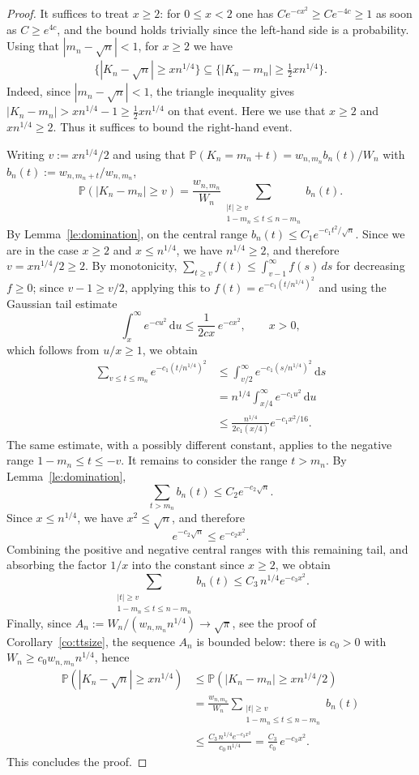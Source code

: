 \documentclass[english,11pt]{smfart}
\newcommand{\Prb}[1]{\mathbb{P}\left(#1\right)}
\numberwithin{equation}{section}
\begin{document}
\begin{proof}
It suffices to treat $x\ge2$: for $0\le x<2$ one has $Ce^{-cx^2}\ge Ce^{-4c}\ge1$
as soon as $C\ge e^{4c}$, and the bound holds trivially since the left-hand side
is a probability. Using that $|m_n-\sqrt n|<1$, for $x\ge2$ we have
\begin{align}\label{eq:proof_tail_K_n}
  \{|K_n-\sqrt n|\ge xn^{1/4}\}\subseteq\{|K_n-m_n|\ge\tfrac12 xn^{1/4}\}.
\end{align}
Indeed, since $|m_n-\sqrt n|<1$, the triangle inequality gives
$|K_n-m_n|>xn^{1/4}-1\ge\tfrac12 xn^{1/4}$
on that event. Here we use that $x \geq 2$ and $xn^{1/4}\ge2$. Thus it suffices to bound the right-hand event.
\smallskip

Writing $v:= xn^{1/4}/2$ and using that
$\Prb{K_n=m_n+t}=w_{n,m_n}b_n(t)/W_n$ with $b_n(t):=w_{n,m_n+t}/w_{n,m_n}$,
\[
  \Prb{|K_n-m_n|\ge v}
  =\frac{w_{n,m_n}}{W_n}
  \sum_{\substack{|t|\ge v\\ 1-m_n\le t\le n-m_n}}b_n(t).
\]
By Lemma~\ref{le:domination}, on the central range $b_n(t)\le C_1 e^{-c_1
t^2/\sqrt n}$. Since we are in the case $x\ge2$ and $x\le n^{1/4}$, we have
$n^{1/4}\ge2$, and therefore $v=xn^{1/4}/2\ge2$. By monotonicity,
$\sum_{t\ge v}f(t)\le\int_{v-1}^\infty f(s)\,ds$ for decreasing $f\ge0$; since
$v-1\ge v/2$, applying this to $f(t)=e^{-c_1(t/n^{1/4})^2}$ and using the
Gaussian tail estimate
\[
  \int_x^\infty e^{-cu^2}\,\mathrm du
  \le\frac{1}{2cx}\,e^{-cx^2}, \qquad x>0,
\]
which follows from $u/x\ge1$, we obtain
\begin{align*}
\sum_{v\le t\le m_n}e^{-c_1(t/n^{1/4})^2}
&\le \int_{v/2}^\infty e^{-c_1(s/n^{1/4})^2}\,\mathrm ds\\
&= n^{1/4}\int_{x/4}^\infty e^{-c_1u^2}\,\mathrm du\\
&\le \frac{n^{1/4}}{2c_1(x/4)}e^{-c_1x^2/16}.
\end{align*}
The same estimate, with a possibly different constant, applies to the
negative range \(1-m_n\le t\le -v\). It remains to consider the range
\(t>m_n\). By Lemma~\ref{le:domination},
\[
\sum_{t>m_n} b_n(t)\le C_2 e^{-c_2\sqrt n}.
\]
Since \(x\le n^{1/4}\), we have \(x^2\le\sqrt n\), and therefore
\[
e^{-c_2\sqrt n}\le e^{-c_2x^2}.
\]
Combining the positive and negative central ranges with this remaining
tail, and absorbing the factor \(1/x\) into the constant since \(x\ge2\),
we obtain
\[
\sum_{\substack{|t|\ge v\\ 1-m_n\le t\le n-m_n}}b_n(t)
\le C_3\,n^{1/4}e^{-c_3x^2}.
\]
Finally, since $A_n:=W_n/(w_{n,m_n}n^{1/4})\to\sqrt\pi$, see the proof of
Corollary~\ref{co:ttsize}, the sequence $A_n$ is bounded below: there is $c_0>0$
with $W_n\ge c_0 w_{n,m_n}n^{1/4}$, hence
\begin{align*}
  \Prb{|K_n-\sqrt n|\ge x n^{1/4}} &\leq \Prb{|K_n-m_n|\ge x n^{1/4}/2} \\
  &= \frac{w_{n,m_n}}{W_n} \sum_{\substack{|t|\ge v\\ 1-m_n\le t\le n-m_n}}b_n(t) \\
  &\le\frac{C_3\,n^{1/4}e^{-c_3 x^2}}{c_0\,n^{1/4}}
  =\frac{C_3}{c_0}\,e^{-c_3 x^2}.
\end{align*}
This concludes the proof.
\end{proof}
\end{document}
